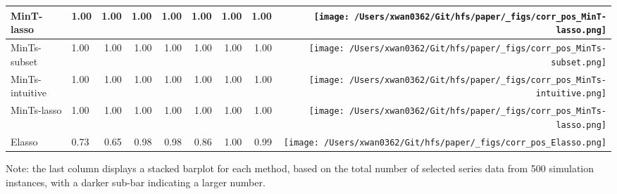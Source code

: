 \documentclass[
  11pt]{article}
\begin{document}
\begin{table}
\begin{threeparttable}
\begin{tabular}{llrrrrrr>{}r}
MinT-lasso & 1.00 & 1.00 & 1.00 & 1.00 & 1.00 & 1.00 & 1.00 & \texttt{[image: /Users/xwan0362/Git/hfs/paper/\_figs/corr\_pos\_MinT-lasso.png]}\\
\midrule
MinTs-subset & 1.00 & 1.00 & 1.00 & 1.00 & 1.00 & 1.00 & 1.00 & \texttt{[image: /Users/xwan0362/Git/hfs/paper/\_figs/corr\_pos\_MinTs-subset.png]}\\
MinTs-intuitive & 1.00 & 1.00 & 1.00 & 1.00 & 1.00 & 1.00 & 1.00 & \texttt{[image: /Users/xwan0362/Git/hfs/paper/\_figs/corr\_pos\_MinTs-intuitive.png]}\\
MinTs-lasso & 1.00 & 1.00 & 1.00 & 1.00 & 1.00 & 1.00 & 1.00 & \texttt{[image: /Users/xwan0362/Git/hfs/paper/\_figs/corr\_pos\_MinTs-lasso.png]}\\
\midrule
Elasso & 0.73 & 0.65 & 0.98 & 0.98 & 0.86 & 1.00 & 0.99 & \texttt{[image: /Users/xwan0362/Git/hfs/paper/\_figs/corr\_pos\_Elasso.png]}\\
\bottomrule
\end{tabular}
\begin{tablenotes}[para]
\item Note: the last column displays a stacked barplot for each method, based on the total number of selected series data from 500 simulation instances, with a darker sub-bar indicating a larger number.
\end{tablenotes}
\end{threeparttable}
\endgroup{}
\end{table}
\end{document}
